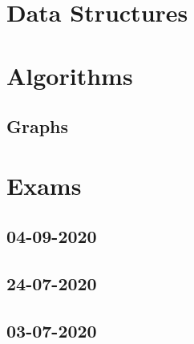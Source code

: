 \documentclass{book}
\begin{document}
  \chapter{Data Structures}
  

  \chapter{Algorithms}
  \section{Graphs}
  

  \chapter{Exams}
  \section{04-09-2020}
  

  \section{24-07-2020}
  

  \section{03-07-2020}
  
\end{document}
